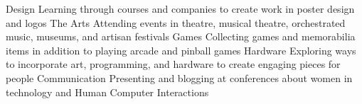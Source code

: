   \begin{cvskills} 
     	 \cvskill
      		{Design}
      		{Learning through courses and companies to create work in poster design and logos}
	 \cvskill
		{The Arts}
		{Attending events in theatre, musical theatre, orchestrated music, museums, and artisan festivals}
	\cvskill
		{Games}
		{Collecting games and memorabilia items in addition to playing arcade and pinball games}
  	\cvskill
		{Hardware}
		{Exploring ways to incorporate art, programming, and hardware to create engaging pieces for people}
	\cvskill
		{Communication}
		{Presenting and blogging at conferences about women in technology and Human Computer Interactions}
  \end{cvskills}
